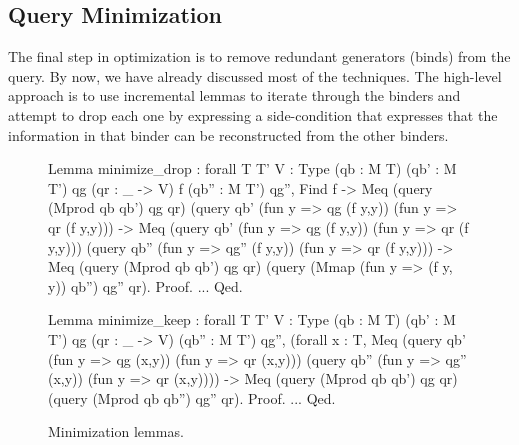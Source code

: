 \documentclass[preprint]{sigplanconf}
\newcommand{\ltac}[0]{\ensuremath{\mathcal{L}_{\mathrm{tac}}}}
\begin{document}


\subsection{Query Minimization}
\label{sec:minimization}

The final step in optimization is to remove redundant generators (binds) from the query.
By now, we have already discussed most of the techniques.
The high-level approach is to use incremental lemmas to iterate through the binders and attempt to drop each one by expressing a side-condition that expresses that the information in that binder can be reconstructed from the other binders.

\begin{figure}
\begin{coq}
Lemma minimize_drop
: forall {T T' V : Type} (qb : M T) (qb' : M T') qg (qr : _ -> V) f (qb'' : M T') qg'',
   Find f
-> Meq (query (Mprod qb qb') qg qr)
       (query qb' (fun y => qg (f y,y)) (fun y => qr (f y,y)))
-> Meq (query qb' (fun y => qg (f y,y)) (fun y => qr (f y,y)))
       (query qb'' (fun y => qg'' (f y,y)) (fun y => qr (f y,y)))
-> Meq (query (Mprod qb qb') qg qr)
       (query (Mmap (fun y => (f y, y)) qb'') qg'' qr).
Proof. ... Qed.

Lemma minimize_keep
: forall {T T' V : Type} (qb : M T) (qb' : M T') qg (qr : _ -> V) (qb'' : M T') qg'',
  (forall x : T,
   Meq (query qb' (fun y => qg (x,y)) (fun y => qr (x,y)))
       (query qb'' (fun y => qg'' (x,y)) (fun y => qr (x,y)))) ->
  Meq (query (Mprod qb qb') qg qr)
      (query (Mprod qb qb'') qg'' qr).
Proof. ... Qed.
\end{coq}
\caption{Minimization lemmas.}
\label{fig:minimize-lemmas}
\end{figure}
\end{document}

